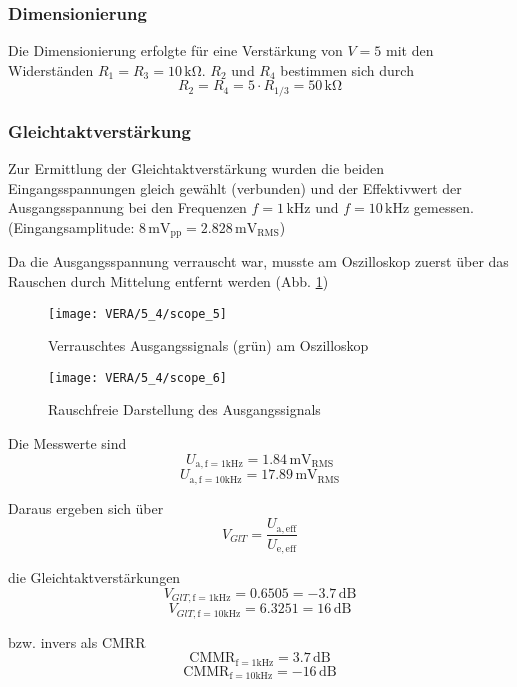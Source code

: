 \subsubsection{Dimensionierung}
Die Dimensionierung erfolgte für eine Verstärkung von $V = 5$ mit den
Widerständen $R_1 = R_3 = 10 \, \si{\kilo\ohm}$. $R_2$ und $R_4$ bestimmen sich
durch
\[R_2 = R_4 = 5 \cdot R_{1/3} = 50 \, \si{\kilo\ohm}\]

\subsubsection{Gleichtaktverstärkung}
Zur Ermittlung der Gleichtaktverstärkung wurden die beiden Eingangsspannungen
gleich gewählt (verbunden) und der Effektivwert der Ausgangsspannung bei den
Frequenzen $f = 1\, \si{\kilo\hertz}$ und $f = 10 \, \si{\kilo\hertz}$ gemessen.
(Eingangsamplitude: $8 \, \si{\milli\volt}_{\mathrm{pp}} = 2.828 \, \si{\milli\volt}_{\mathrm{RMS}}$)

Da die Ausgangsspannung verrauscht war, musste am Oszilloskop zuerst über
 das Rauschen durch Mittelung
entfernt werden (Abb. \ref{fig:rauschi})

\begin{figure}[H]
  \begin{center}
    \texttt{[image: VERA/5\_4/scope\_5]}
  \end{center}
  \caption{Verrauschtes Ausgangssignals (grün) am Oszilloskop}
  \label{fig:rauschi}
\end{figure}

\begin{figure}[H]
  \begin{center}
    \texttt{[image: VERA/5\_4/scope\_6]}
  \end{center}
  \caption{Rauschfreie Darstellung des Ausgangssignals}
\end{figure}

Die Messwerte sind
\[U_{\mathrm{a, f=1kHz}} = 1.84 \, \si{\milli\volt}_{\mathrm{RMS}}\]
\[U_{\mathrm{a, f=10kHz}} = 17.89 \, \si{\milli\volt}_{\mathrm{RMS}} \]

Daraus ergeben sich über
\[V_{GlT} = \frac{U_{\mathrm{a, eff}}}{U_{\mathrm{e, eff}}}\]

die Gleichtaktverstärkungen
\[V_{GlT, \mathrm{f=1kHz}} = 0.6505 = -3.7 \, \si{\deci\bel}\]
\[V_{GlT, \mathrm{f=10kHz}} = 6.3251 = 16 \, \si{\deci\bel}\]

bzw. invers als CMRR
\[\mathrm{CMMR}_{\mathrm{f=1kHz}} = 3.7 \, \si{\deci\bel}\]
\[\mathrm{CMMR}_{\mathrm{f=10kHz}} = -16 \, \si{\deci\bel}\]

